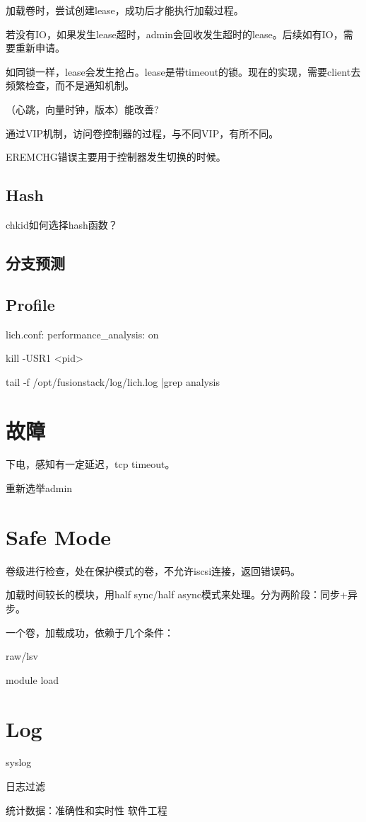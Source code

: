 加载卷时，尝试创建lease，成功后才能执行加载过程。

若没有IO，如果发生lease超时，admin会回收发生超时的lease。后续如有IO，需要重新申请。

如同锁一样，lease会发生抢占。lease是带timeout的锁。现在的实现，需要client去频繁检查，而不是通知机制。

（心跳，向量时钟，版本）能改善?

通过VIP机制，访问卷控制器的过程，与不同VIP，有所不同。

EREMCHG错误主要用于控制器发生切换的时候。

\subsection{Hash}

chkid如何选择hash函数？

\subsection{分支预测}

\subsection{Profile}

lich.conf: performance\_analysis: on

kill -USR1 <pid>

tail -f /opt/fusionstack/log/lich.log |grep analysis

\section{故障}

下电，感知有一定延迟，tcp timeout。

重新选举admin

\section{Safe Mode}

卷级进行检查，处在保护模式的卷，不允许iscsi连接，返回错误码。

加载时间较长的模块，用half sync/half async模式来处理。分为两阶段：同步+异步。

一个卷，加载成功，依赖于几个条件：
\begin{compactitem}
    \item raw/lsv
    \item module load
\end{compactitem}

\section{Log}

syslog

日志过滤

统计数据：准确性和实时性
软件工程
